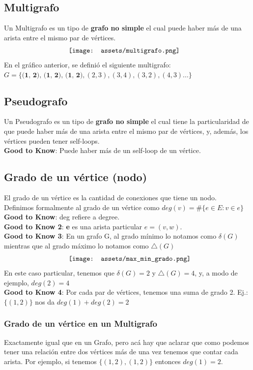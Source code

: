 \documentclass[10pt,a4paper]{article}
\begin{document}
\subsection*{Multigrafo}
Un Multigrafo es un tipo de \textbf{grafo no simple} el cual puede haber más de una arista entre el mismo par de vértices. 
\[\begin{minipage}[b]{0.5\textwidth}
    \texttt{[image: assets/multigrafo.png]}
\end{minipage}\]
En el gráfico anterior, se definió el siguiente multigrafo: $G = \{\textbf{(1, 2), (1, 2), (1, 2)}, (2, 3), (3, 4), (3, 2), (4, 3) ...\}$
\subsection*{Pseudografo}
Un Pseudografo es un tipo de \textbf{grafo no simple} el cual tiene la particularidad de que puede haber más de una arista entre el mismo par de vértices, y, además, los vértices pueden tener self-loops. \\
\textbf{Good to Know}: Puede haber más de un self-loop de un vértice.
\subsection*{Grado de un vértice (nodo)}
El grado de un vértice es la cantidad de conexiones que tiene un nodo. \\
Definimos formalmente al grado de un vértice como $deg(v) = \#\{e \in E : v \in e\}$ \\
\textbf{Good to Know}: deg refiere a degree. \\
\textbf{Good to Know 2}: \textbf{e} es una arista particular $e = (v, w)$.\\
\textbf{Good to Know 3}: En un grafo G, al grado mínimo lo notamos como $\delta(G)$ mientras que al grado máximo lo notamos como $\triangle(G)$
\[\begin{minipage}[b]{0.5\textwidth}
    \texttt{[image: assets/max\_min\_grado.png]}
\end{minipage}\]
En este caso particular, tenemos que $\delta(G) = 2$ y $\triangle(G) = 4$, y, a modo de ejemplo, $deg(2) = 4$ \\
\textbf{Good to Know 4}: Por cada par de vértices, tenemos una suma de grado 2. Ej.: $\{(1,2)\}$ nos da $deg(1) + deg(2) = 2$
\subsubsection*{Grado de un vértice en un Multigrafo}
Exactamente igual que en un Grafo, pero acá hay que aclarar que como podemos tener una relación entre dos vértices más de una vez tenemos que contar cada arista. Por ejemplo, si tenemos $\{(1,2), (1,2)\}$ entonces $deg(1) = 2$.
\end{document}
